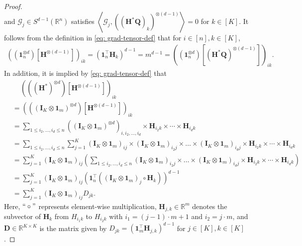 \documentclass{article}
\theoremstyle{plain}
\theoremstyle{definition}
\theoremstyle{remark}
\newcommand{\Br}{\mathbb{R}}
\newcommand{\BH}{\bm{H}}
\newcommand{\BQ}{\bm{Q}}
\newcommand{\GCal}{\mathcal{G}}
\def\b1{\bm{1}}
\begin{document}
\begin{appendix}
\begin{center}
\begin{proof}
\begin{equation}
			\end{equation}
   and $\GCal_j \in S^{d-1}(\Br^n)$ satisfies $\left\langle \GCal_j,((\BH^* \BQ)_k)^{\otimes (d-1)} \right\rangle = 0$ for $k\in [K]$. 
			It follows from the definition in \eqref{eq: grad-tensor-def} that for $i\in [n], k\in [K]$,
			\begin{align}
				\left( \left(\b1_n^{\otimes d} \right)\left[\bm{H}^{\otimes (d-1)} \right] \right)_{ik} = \left(\b1_n^\top \bm{H} _k \right)^{d-1}= m^{d-1} = \left( \left(\b1_n^{\otimes d} \right)\left[(\BH^* \BQ)^{\otimes (d-1)} \right] \right)_{ik}. \label{linearoperator-zero}
			\end{align}
			In addition, it is implied by \eqref{eq: grad-tensor-def} that
			\begin{align}
				& \quad \, \left( \left(\left(\BH^*\right)^{\otimes d} \right)\left[\bm{H}^{\otimes (d-1)}\right] \right)_{ik} \nonumber \\
				& =  \left(\left( \left(\bm{I}_K \otimes \b1_m \right)^{\otimes d} \right)\left[\bm{H}^{\otimes (d-1)} \right] \right)_{ik}  \nonumber \\
				& = \sum_{1 \leq i_2,\dots,i_d \leq n} \left( \left(\bm{I}_K \otimes \b1_m \right)^{\otimes d} \right)_{i,i_2,\dots,i_d} \times \bm{H}_{i_2k} \times \cdots \times \bm{H}_{i_dk} \nonumber \\
				& = \sum_{1 \leq i_2,\dots,i_d \leq n} \sum_{j=1}^K \left(\bm{I}_K \otimes \b1_m \right)_{ij} \times \left(\bm{I}_K \otimes \b1_m \right)_{i_2j} \times \dots \times \left(\bm{I}_K \otimes \b1_m \right)_{i_dj}  \times \bm{H}_{i_2k} \times \cdots \times \bm{H}_{i_dk}    \nonumber \\
				& = \sum_{j=1}^K \left(\bm{I}_K \otimes \b1_m \right)_{ij} \left( \sum_{1 \leq i_2,\dots,i_d \leq n}  \left(\bm{I}_K \otimes \b1_m \right)_{i_2j} \times \dots \times \left(\bm{I}_K \otimes \b1_m \right)_{i_dj}  \times \bm{H}_{i_2k} \times \cdots \times \bm{H}_{i_dk}  \right) \nonumber \\
				& = \sum_{j=1}^K \left(\bm{I}_K \otimes \b1_m \right)_{ij} \left( \b1_n^\top \left( \left(\bm{I}_K \otimes \b1_m \right)_j \circ \BH_k   \right) \right)^{d-1} \nonumber \\
				& = \sum_{j=1}^K (\bm{I}_K \otimes \b1_m)_{ij} D_{jk}. \label{eq: D-def}
			\end{align}
			Here, $``\circ"$ represents element-wise multiplication,  $\BH_{j,k} \in \Br^{m}$ denotes the subvector of $\BH_k$ from $H_{i_1 k}$ to $H_{i_2 k}$ with $i_1 = (j-1) \cdot m+1$ and $i_2 = j \cdot m$, and $\bm{D} \in \Br^{K \times K}$ is the matrix given by $D_{jk} = (\b1_m^\top \BH_{j,k} )^{d-1}$ for $j\in [K], k \in [K]$.

\end{proof}
\end{center}
\end{appendix}
\end{document}
